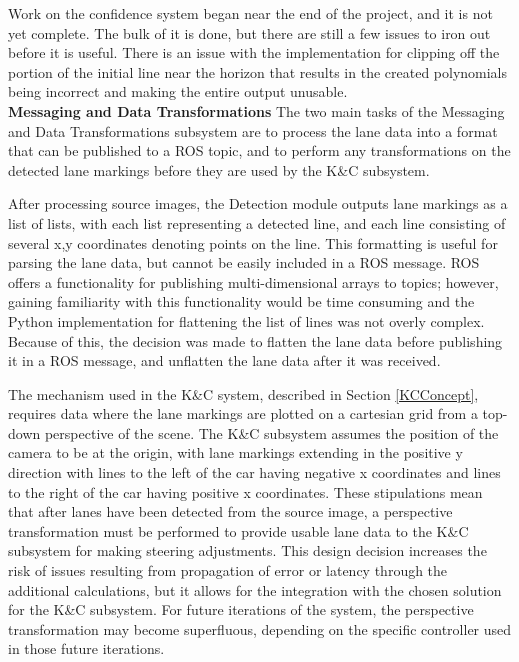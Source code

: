 \documentclass[titlepage, draft]{article}
\begin{document}
{Work on the confidence system began near the end of the project, and it is not yet complete. The bulk of it is done, but there are still a few issues to iron out before it is useful. There is an issue with the implementation for clipping off the portion of the initial line near the horizon that results in the created polynomials being incorrect and making the entire output unusable.
\\

\textbf{Messaging and Data Transformations}
The two main tasks of the Messaging and Data Transformations subsystem are to process the lane data into a format that can be published to a ROS topic, and to perform any transformations on the detected lane markings before they are used by the K\&C subsystem.

After processing source images, the Detection module outputs lane markings as a list of lists, with each list representing a detected line, and each line consisting of several x,y coordinates denoting points on the line.  This formatting is useful for parsing the lane data, but cannot be easily included in a ROS message. ROS offers a functionality for publishing multi-dimensional arrays to topics; however, gaining familiarity with this functionality would be time consuming and the Python implementation for flattening the list of lines was not overly complex. Because of this, the decision was made to flatten the lane data before publishing it in a ROS message, and unflatten the lane data after it was received.

The mechanism used in the K\&C system, described in Section \ref{KCConcept}, requires data where the lane markings are plotted on a cartesian grid from a top-down perspective of the scene. The K\&C subsystem assumes the position of the camera to be at the origin, with lane markings extending in the positive y direction with lines to the left of the car having negative x coordinates and lines to the right of the car having positive x coordinates. These stipulations mean that after lanes have been detected from the source image, a perspective transformation must be performed to provide usable lane data to the K\&C subsystem for making steering adjustments. This design decision increases the risk of issues resulting from propagation of error or latency through the additional calculations, but it allows for the integration with the chosen solution for the K\&C subsystem. For future iterations of the system, the perspective transformation may become superfluous, depending on the specific controller used in those future iterations.


}
\end{document}
